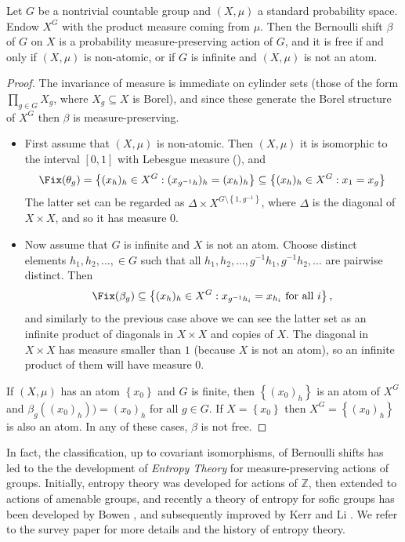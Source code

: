 \begin{proposition}
Let $G$ be a nontrivial countable group and $(X,\mu)$ a standard probability space. Endow $X^G$ with the product measure coming from $\mu$. Then the Bernoulli shift $\beta$ of $G$ on $X$ is a probability measure-preserving action of $G$, and it is free if and only if $(X,\mu)$ is non-atomic, or if $G$ is infinite and $(X,\mu)$ is not an atom.
\end{proposition}
\begin{proof}
The invariance of measure is immediate on cylinder sets (those of the form $\prod_{g\in G} X_g$, where $X_g\subseteq X$ is Borel), and since these generate the Borel structure of $X^G$ then $\beta$ is measure-preserving.
\begin{itemize}
\item First assume that $(X,\mu)$ is non-atomic. Then $(X,\mu)$ it is isomorphic to the interval $[0,1]$ with Lebesgue measure (\cite[Theorem 17.41]{MR1321597}), and
\[\Fix(\theta_g)=\left\{(x_h)_h\in X^G:(x_{g^{-1}h})_h=(x_h)_h\right\}\subseteq\left\{(x_h)_h\in X^G:x_1=x_g\right\}\]
The latter set can be regarded as $\Delta\times X^{G\setminus\left\{1,g^{-1}\right\}}$, where $\Delta$ is the diagonal of $X\times X$, and so it has measure $0$.

\item Now assume that $G$ is infinite and $X$ is not an atom. Choose distinct elements $h_1,h_2,\ldots,\in G$ such that all $h_1,h_2,\ldots,g^{-1}h_1,g^{-1}h_2,\ldots$ are pairwise distinct. Then
\[\Fix(\beta_g)\subseteq\left\{(x_h)_h\in X^G:x_{g^{-1}h_i}=x_{h_i}\text{ for all }i\right\},\]
and similarly to the previous case above we can see the latter set as an infinite product of diagonals in $X\times X$ and copies of $X$. The diagonal in $X\times X$ has measure smaller than $1$ (because $X$ is not an atom), so an infinite product of them will have measure $0$.
\end{itemize}

If $(X,\mu)$ has an atom $\left\{x_0\right\}$ and $G$ is finite, then $\left\{(x_0)_h\right\}$ is an atom of $X^G$ and $\beta_g((x_0)_h))=(x_0)_h$ for all $g\in G$. If $X=\left\{x_0\right\}$ then $X^G=\left\{(x_0)_h\right\}$ is also an atom. In any of these cases, $\beta$ is not free.\qedhere
\end{proof}

\begin{remark}
In fact, the classification, up to covariant isomorphisms, of Bernoulli shifts has led to the the development of \emph{Entropy Theory} for measure-preserving actions of groups. Initially, entropy theory was developed for actions of $\mathbb{Z}$, then extended to actions of amenable groups, and recently a theory of entropy for sofic groups has been developed by Bowen \cite{MR2552252}, and subsequently improved by Kerr and Li \cite{MR2854085}. We refer to the survey paper \cite{MR3666024} for more details and the history of entropy theory.
\end{remark}

